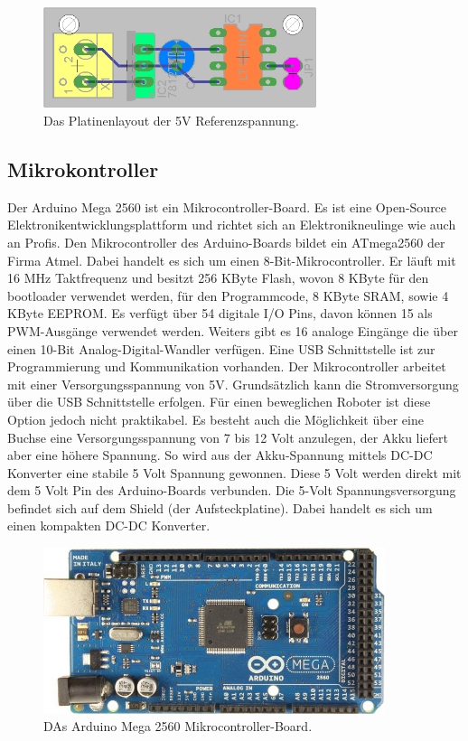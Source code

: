 \documentclass[a4paper,bibtotoc,oneside]{scrbook}
\begin{document}
\begin{figure}[htbp]
\centering
\includegraphics[width=80mm]{img/refu2.png}
\caption{Das Platinenlayout der 5V Referenzspannung.}\label{refu2}
\end{figure}

 
\subsection{Mikrokontroller}\thispagestyle{empty}
Der Arduino Mega 2560 ist ein Mikrocontroller-Board. Es ist eine Open-Source Elektronikentwicklungsplattform und richtet sich an Elektronikneulinge wie auch an Profis. Den Mikrocontroller des Arduino-Boards bildet ein ATmega2560 der Firma Atmel. Dabei handelt es sich um einen 8-Bit-Mikrocontroller.  Er läuft mit 16 MHz Taktfrequenz und besitzt 256 KByte Flash, wovon 8 KByte für den bootloader verwendet werden, für den Programmcode, 8 KByte SRAM, sowie 4 KByte EEPROM.  Es verfügt über 54 digitale I/O Pins, davon können 15 als PWM-Ausgänge verwendet werden. Weiters gibt es 16 analoge Eingänge die über einen 10-Bit Analog-Digital-Wandler verfügen.
Eine USB Schnittstelle ist zur Programmierung und Kommunikation vorhanden.
Der Mikrocontroller arbeitet mit einer Versorgungsspannung von 5V. Grundsätzlich kann die Stromversorgung über die USB Schnittstelle erfolgen. Für einen beweglichen Roboter ist diese Option jedoch nicht praktikabel. Es besteht auch die Möglichkeit über eine Buchse eine Versorgungsspannung von 7 bis 12 Volt anzulegen, der Akku liefert aber eine höhere Spannung. So wird aus der Akku-Spannung mittels DC-DC Konverter
eine stabile 5 Volt Spannung gewonnen. Diese 5 Volt werden direkt mit dem 5 Volt Pin des Arduino-Boards verbunden. Die 5-Volt Spannungsversorgung befindet sich auf dem Shield (der Aufsteckplatine). Dabei handelt es sich um einen kompakten DC-DC Konverter.

\begin{figure}[htbp]
\centering
\includegraphics[width=100mm]{img/ArduinoMega2.jpg}
\caption[Arduino Mega 2560]{DAs Arduino Mega 2560 Mikrocontroller-Board.}\label{ardu}
\end{figure}
\end{document}
